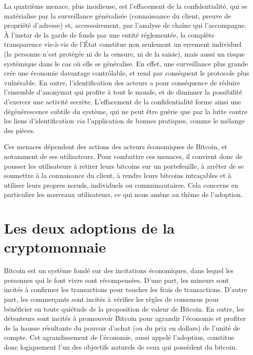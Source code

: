 La quatrième menace, plus insidieuse, est l'effacement de la confidentialité, qui se matérialise par la surveillance généralisée (connaissance du client, preuve de propriété d'adresse) et, accessoirement, par l'analyse de chaîne qui l'accompagne. À l'instar de la garde de fonds par une entité réglementée, la complète transparence vis-à-vis de l'État constitue non seulement un errement individuel (la personne n'est protégée ni de la censure, ni de la saisie), mais aussi un risque systémique dans le cas où elle se généralise. En effet, une surveillance plus grande crée une économie davantage contrôlable, et rend par conséquent le protocole plus vulnérable. En outre, l'identification des acteurs a pour conséquence de réduire l'ensemble d'anonymat qui profite à tout le monde, et de diminuer la possibilité d'exercer une activité secrète. L'effacement de la confidentialité forme ainsi une dégénérescence subtile du système, qui ne peut être guérie que par la lutte contre les liens d'identification \emph{via} l'application de bonnes pratiques, comme le mélange des pièces. %

Ces menaces dépendent des actions des acteurs économiques de Bitcoin, et notamment de ses utilisateurs. Pour combattre ces menaces, il convient donc de pousser les utilisateurs à retirer leurs bitcoins sur un portefeuille, à arrêter de se soumettre à la connaisance du client, à rendre leurs bitcoins intraçables et à utiliser leurs propres nœuds, individuels ou communautaires. Cela concerne en particulier les nouveaux utilisateurs, ce qui nous amène au thème de l'adoption.

\section*{Les deux adoptions de la cryptomonnaie}

Bitcoin est un système fondé sur des incitations économiques, dans lequel les personnes qui le font vivre sont récompensées. D'une part, les mineurs sont incités à confirmer les transactions pour toucher les frais de transactions. D'autre part, les commerçants sont incités à vérifier les règles de consensus pour bénéficier en toute quiétude de la proposition de valeur de Bitcoin. En outre, les détenteurs sont incités à promouvoir Bitcoin pour agrandir l'économie et profiter de la hausse résultante du pouvoir d'achat (ou du prix en dollars) de l'unité de compte. Cet agrandissement de l'économie, aussi appelé l'adoption, constitue donc logiquement l'un des objectifs naturels de ceux qui possèdent du bitcoin.

